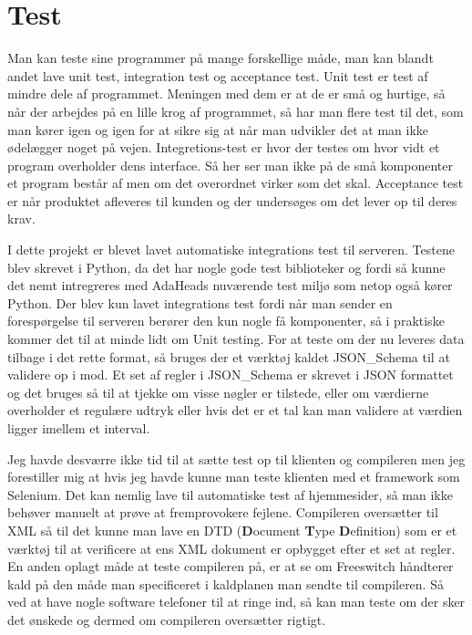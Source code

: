 \chapter{Test}
Man kan teste sine programmer på mange forskellige måde, man kan blandt andet lave unit test, integration test og acceptance test. Unit test er test af mindre dele af programmet. Meningen med dem er at de er små og hurtige, så når der arbejdes på en lille krog af programmet, så har man flere test til det, som man kører igen og igen for at sikre sig at når man udvikler det at man ikke ødelægger noget på vejen\citep{osherove2010artofunittesting}.
Integretions-test er hvor der testes om hvor vidt et program overholder dens interface. Så her ser man ikke på de små komponenter et program består af men om det overordnet virker som det skal.
Acceptance test er når produktet afleveres til kunden og der undersøges om det lever op til deres krav.

I dette projekt er blevet lavet automatiske integrations test til serveren. Testene blev skrevet i Python, da det har nogle gode test biblioteker og fordi så kunne det nemt intregreres med AdaHeads nuværende test miljø som netop også kører Python. Der blev kun lavet integrations test fordi når man sender en forespørgelse til serveren berører den kun nogle få komponenter, så i praktiske kommer det til at minde lidt om Unit testing.
For at teste om der nu leveres data tilbage i det rette format, så bruges der et værktøj kaldet JSON\_Schema til at validere op i mod. Et set af regler i JSON\_Schema er skrevet i JSON formattet og det bruges så til at tjekke om visse nøgler er tilstede, eller om værdierne overholder et regulære udtryk eller hvis det er et tal kan man validere at værdien ligger imellem et interval.

Jeg havde desværre ikke tid til at sætte test op til klienten og compileren men jeg forestiller mig at hvis jeg havde kunne man teste klienten med et framework som Selenium. Det kan nemlig lave til automatiske test af hjemmesider, så man ikke behøver manuelt at prøve at fremprovokere fejlene. Compileren oversætter til XML så til det kunne man lave en DTD (\textbf{D}ocument \textbf{T}ype \textbf{D}efinition) som er et værktøj til at verificere at ens XML dokument er opbygget efter et set at regler. En anden oplagt måde at teste compileren på, er at se om Freeswitch håndterer kald på den måde man specificeret i kaldplanen man sendte til compileren. Så ved at have nogle software telefoner til at ringe ind, så kan man teste om der sker det ønskede og dermed om compileren oversætter rigtigt. 
